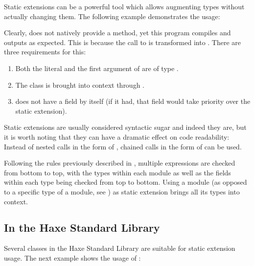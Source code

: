 \documentclass{haxe}
\begin{document}

Static extensions can be a powerful tool which allows augmenting types without actually changing them. The following example demonstrates the usage:


Clearly,  does not natively provide a  method, yet this program compiles and outputs  as expected. This is because the call to  is transformed into . There are three requirements for this:

\begin{enumerate}
	\item Both the literal  and the first argument of  are of type .
	\item The class  is brought into context through .
	\item {} does not have a  field by itself (if it had, that field would take priority over the static extension).
\end{enumerate}

Static extensions are usually considered syntactic sugar and indeed they are, but it is worth noting that they can have a dramatic effect on code readability: Instead of nested calls in the form of , chained calls in the form of  can be used.

Following the rules previously described in , multiple  expressions are checked from bottom to top, with the types within each module as well as the fields within each type being checked from top to bottom. Using a module (as opposed to a specific type of a module, see ) as static extension brings all its types into context.

\subsection{In the Haxe Standard Library}
\label{lf-static-extension-in-std}

Several classes in the Haxe Standard Library are suitable for static extension usage. The next example shows the usage of :
\end{document}
